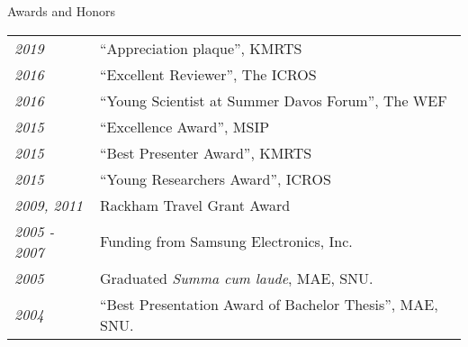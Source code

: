 \newpage
\begin{rSection}{Awards and Honors}
    \begin{tabular}{ @{} >{\itshape}l @{\hspace{6ex}} l }
    2019        & ``Appreciation plaque'', \ac{KMRTS}\\
    2016        & ``Excellent Reviewer'', The \ac{ICROS} \\
    2016        & ``Young Scientist at Summer Davos Forum'', The \ac{WEF} \\
    2015        & ``Excellence Award'', \ac{MSIP} \\
    2015        & ``Best Presenter Award'', \ac{KMRTS}\\
    2015        & ``Young Researchers Award'', \ac{ICROS} \\
    2009, 2011  & Rackham Travel Grant Award\\
    2005 - 2007 & Funding from Samsung Electronics, Inc. \\
    2005        & Graduated {\em Summa cum laude}, MAE, SNU. \\
    2004        & ``Best Presentation Award of Bachelor Thesis'', MAE, SNU. \\
    \end{tabular}
\end{rSection}
